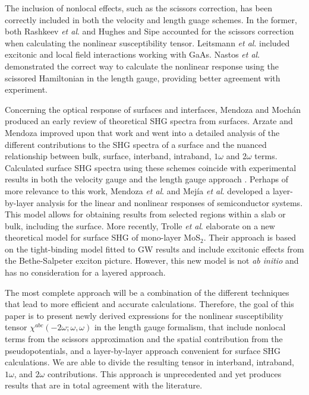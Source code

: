 The inclusion of nonlocal effects, such as the scissors correction, has been
correctly included in both the velocity and length guage schemes. 
In the former, both 
Rashkeev \emph{et al}.\cite{rashkeevPRB98} and 
Hughes and Sipe\cite{hughesPRB96} 
accounted for the scissors correction when calculating the nonlinear 
susceptibility tensor.
Leitsmann \emph{et al}.\cite{leitsmannPRB05} 
included excitonic and local field interactions working with GaAs.
Nastos \emph{et al}.\cite{nastosPRB05} demonstrated the correct 
way to calculate the nonlinear response using the scissored Hamiltonian 
in the length gauge, providing better agreement with experiment. 

Concerning the optical response of surfaces and interfaces,
Mendoza and Moch\'an\cite{mendozaPRB96} produced an early review of 
theoretical SHG spectra from surfaces. 
Arzate and Mendoza\cite{arzatePRB01} improved upon that work and
went into a detailed analysis of the different contributions to the 
SHG spectra of a surface and the nuanced relationship between bulk, 
surface, interband, intraband, $1\omega$ and $2\omega$ terms. 
Calculated surface SHG spectra using these schemes coincide with experimental
results in both the velocity gauge
\cite{mendozaPRB01,mendozaPRL98,reiningPRB94} and the length gauge approach
\cite{sharmaPRB03}. 
Perhaps of more relevance to this work, 
Mendoza \emph{et al}.\cite{mendozaPRB06} and 
Mejía \emph{et al}.\cite{mejiaRMF04} developed a layer-by-layer analysis for 
the linear and nonlinear responses of semiconductor systems. This model
allows for obtaining results from selected regions within a slab or bulk,
including the surface.
More recently, 
Trolle \emph{et al}.\cite{trollePRB14} 
elaborate on a new theoretical model for surface SHG of 
mono-layer MoS$_{2}$. Their approach is based on the tight-binding model 
fitted to GW results and include excitonic effects from the 
Bethe-Salpeter exciton picture. However, this new model is not 
\emph{ab initio} and has no consideration for a layered approach.

The most complete approach will be a combination of the different techniques 
that lead to more efficient and accurate calculations. Therefore,
the goal of this paper is to present newly derived expressions for the 
nonlinear susceptibility tensor $\chi^{abc}(-2\omega;\omega,\omega)$ 
in the length gauge formalism, 
that include nonlocal terms from the scissors approximation 
and the spatial contribution from the pseudopotentials, and a 
layer-by-layer approach convenient for surface SHG calculations. We are
able to divide the resulting tensor in interband, intraband, $1\omega$, and 
$2\omega$ contributions. This approach is unprecedented and yet produces 
results that are in total agreement with the literature.


